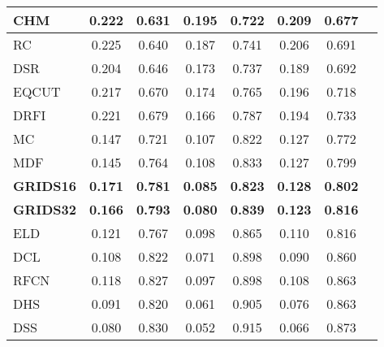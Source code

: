\documentclass[a4paper,conference]{IEEEtran}
\begin{document}
\begin{table}
\begin{tabular}{|p{1cm}|c|c|c|c|c|c|c|}
    CHM & 0.222 & 0.631 & 0.195 & 0.722 & 0.209 & 0.677  \\ \hline    
    RC & 0.225 & 0.640 & 0.187 & 0.741 & 0.206 & 0.691 \\ \hline
    DSR & 0.204 & 0.646 & 0.173 & 0.737 & 0.189 & 0.692  \\ \hline
    EQCUT & 0.217 & 0.670 & 0.174 & 0.765 & 0.196 & 0.718  \\ \hline
    DRFI & 0.221 & 0.679 & 0.166 & 0.787 & 0.194 & 0.733 \\ \hline
    MC & 0.147 & 0.721 & 0.107 & 0.822 & 0.127 & 0.772  \\ \hline
    MDF & 0.145 & 0.764 & 0.108 & 0.833 & 0.127 & 0.799   \\ \hline
    \textbf{GRIDS16} & \textbf{0.171} & \textbf{0.781} & \textbf{0.085} & \textbf{0.823} & \textbf{0.128} & \textbf{0.802} \\ \hline    
        \textbf{GRIDS32} & \textbf{0.166} & \textbf{0.793} & \textbf{0.080} & \textbf{0.839} & \textbf{0.123} & \textbf{0.816} \\ \hline    ELD & 0.121 & 0.767 & 0.098 & 0.865 & 0.110 & 0.816  \\ \hline
    DCL & 0.108 & 0.822 & 0.071 & 0.898 & 0.090 & 0.860 \\ \hline
    RFCN & 0.118 & 0.827 & 0.097 & 0.898 & 0.108 & 0.863  \\ \hline
    DHS & 0.091 & 0.820 & 0.061 & 0.905 & 0.076 & 0.863  \\ \hline
    DSS & 0.080 & 0.830 & 0.052 & 0.915 & 0.066 & 0.873  \\ \hline
  \end{tabular}
  \label{table1}

\end{table}
\end{document}
